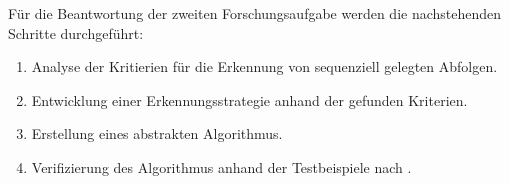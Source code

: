Für die Beantwortung der zweiten Forschungsaufgabe werden die nachstehenden Schritte durchgeführt:
\begin{enumerate}
	\item Analyse der Kritierien für die Erkennung von sequenziell gelegten Abfolgen.
	\item Entwicklung einer Erkennungsstrategie anhand der gefunden Kriterien.
	\item Erstellung eines abstrakten Algorithmus.
	\item Verifizierung des Algorithmus anhand der Testbeispiele nach \citet{max}.
\end{enumerate}









